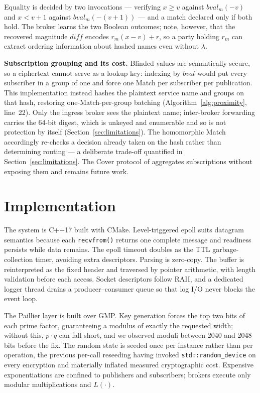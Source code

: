 \documentclass[10pt]{article}
\begin{document}
Equality is decided by two invocations --- verifying $x \ge v$ against $bval_m(-v)$ and $x < v+1$ against $bval_m(-(v+1))$ --- and a match declared only if both hold. The broker learns the two Boolean outcomes; note, however, that the recovered magnitude $\textit{diff}$ encodes $r_m(x-v)+r$, so a party holding $r_m$ can extract ordering information about hashed names even without $\lambda$.

\textbf{Subscription grouping and its cost.}
Blinded values are semantically secure, so a ciphertext cannot serve as a lookup key: indexing by $bval$ would put every subscriber in a group of one and force one Match per subscriber per publication.
This implementation instead hashes the plaintext service name and groups on that hash, restoring one-Match-per-group batching (Algorithm~\ref{alg:proximity}, line~22).
Only the ingress broker sees the plaintext name; inter-broker forwarding carries the 64-bit digest, which is unkeyed and enumerable and so is not protection by itself (Section~\ref{sec:limitations}).
The homomorphic Match accordingly re-checks a decision already taken on the hash rather than determining routing --- a deliberate trade-off quantified in Section~\ref{sec:limitations}.
The Cover protocol of \citet{nabeel2012efficient} aggregates subscriptions without exposing them and remains future work.

\section{Implementation}
\label{sec:impl}

The system is C++17 built with CMake. Level-triggered epoll suits datagram semantics because each \texttt{recvfrom()} returns one complete message and readiness persists while data remains. The epoll timeout doubles as the TTL garbage-collection timer, avoiding extra descriptors. Parsing is zero-copy. The buffer is reinterpreted as the fixed header and traversed by pointer arithmetic, with length validation before each access. Socket descriptors follow RAII, and a dedicated logger thread drains a producer--consumer queue so that log I/O never blocks the event loop.

The Paillier layer is built over GMP. Key generation forces the top two bits of each prime factor, guaranteeing a modulus of exactly the requested width; without this, $p \cdot q$ can fall short, and we observed moduli between 2040 and 2048 bits before the fix. The random state is seeded once per instance rather than per operation, the previous per-call reseeding having invoked \texttt{std::random\_device} on every encryption and materially inflated measured cryptographic cost. Expensive exponentiations are confined to publishers and subscribers; brokers execute only modular multiplications and $L(\cdot)$.
\end{document}
